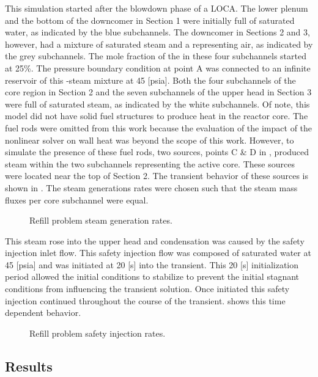 This simulation started after the blowdown phase of a LOCA.
The lower plenum and the bottom of the downcomer in Section 1 were initially full of saturated water, as indicated by the blue subchannels.
The downcomer in Sections 2 and 3, however, had a mixture of saturated steam and a \ncg{} representing air, as indicated by the grey subchannels.
The mole fraction of the \ncgs{} in these four subchannels started at 25\%.
The pressure boundary condition at point A was connected to an infinite reservoir of this \ncg{}-steam mixture at 45 [psia]. 
Both the four subchannels of the core region in Section 2 and the seven subchannels of the upper head in Section 3 were full of saturated steam, as indicated by the white subchannels.
Of note, this model did not have solid fuel structures to produce heat in the reactor core.
The fuel rods were omitted from this work because the evaluation of the impact of the nonlinear solver on wall heat was beyond the scope of this work.
However, to simulate the presence of these fuel rods, two sources, points C \& D in , produced steam within the two subchannels representing the active core.
These sources were located near the top of Section 2.
The transient behavior of these sources is shown in .
The steam generations rates were chosen such that the steam mass fluxes per core subchannel were equal.

\begin{figure}[h!tb]
\centering

\caption{Refill problem steam generation rates.}
\label{fig:refillSteamRates}
\end{figure}

This steam rose into the upper head and condensation was caused by the safety injection inlet flow.
This safety injection flow was composed of saturated water at 45 [psia] and was initiated at 20 [s] into the transient.
This 20 [s] initialization period allowed the initial conditions to stabilize to prevent the initial stagnant conditions from influencing the transient solution.
Once initiated this safety injection continued throughout the course of the transient.
 shows this time dependent behavior.

\begin{figure}[h!tb]
\centering

\caption{Refill problem safety injection rates.}
\label{fig:refillSafetyInjection}
\end{figure}

\subsection{Results}
\label{sect:refillResults}

